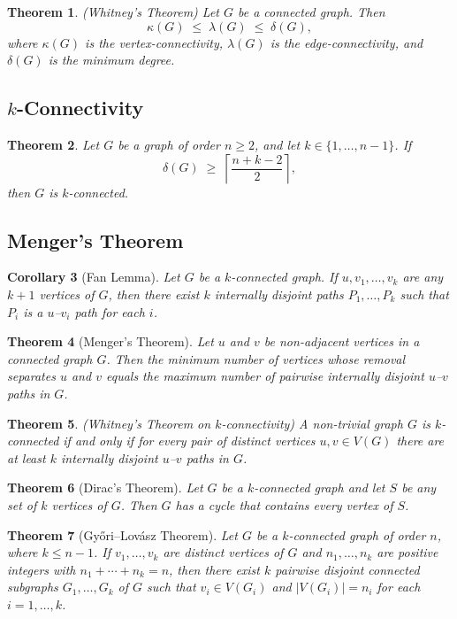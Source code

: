 \documentclass{article}
\newtheorem{theorem}{Theorem}[section]
\newtheorem{corollary}[theorem]{Corollary}
\begin{document}
\begin{theorem}
(Whitney's Theorem) Let $G$ be a connected graph. Then 
$$
\kappa(G)\;\le\;\lambda(G)\;\le\;\delta(G),
$$
where $\kappa(G)$ is the vertex-connectivity, $\lambda(G)$ is the edge-connectivity, and $\delta(G)$ is the minimum degree.
\end{theorem}

\subsection{$k$-Connectivity}
\begin{theorem}
Let $G$ be a graph of order $n\ge 2$, and let $k\in\{1,\dots,n-1\}$. If 
$$
\delta(G)\;\ge\;\left\lceil\frac{n+k-2}{2}\right\rceil,
$$
then $G$ is $k$-connected.
\end{theorem}

\subsection{Menger's Theorem}
\begin{corollary}[Fan Lemma]
Let $G$ be a $k$-connected graph. If $u,v_1,\dots,v_k$ are any $k+1$ vertices of $G$, then there exist $k$ internally disjoint paths $P_1,\dots,P_k$ such that $P_i$ is a $u$--$v_i$ path for each $i$.
\end{corollary}

\begin{theorem}[Menger's Theorem]
Let $u$ and $v$ be non-adjacent vertices in a connected graph $G$. Then the minimum number of vertices whose removal separates $u$ and $v$ equals the maximum number of pairwise internally disjoint $u$--$v$ paths in $G$.
\end{theorem}

\begin{theorem}
(Whitney's Theorem on $k$-connectivity) A non-trivial graph $G$ is $k$-connected if and only if for every pair of distinct vertices $u,v\in V(G)$ there are at least $k$ internally disjoint $u$--$v$ paths in $G$.
\end{theorem}

\begin{theorem}[Dirac's Theorem]
Let $G$ be a $k$-connected graph and let $S$ be any set of $k$ vertices of $G$. Then $G$ has a cycle that contains every vertex of $S$.
\end{theorem}

\begin{theorem}[Gy\H{o}ri--Lov\'asz Theorem]
Let $G$ be a $k$-connected graph of order $n$, where $k\le n-1$. If $v_1,\dots,v_k$ are distinct vertices of $G$ and $n_1,\dots,n_k$ are positive integers with $n_1+\cdots+n_k = n$, then there exist $k$ pairwise disjoint connected subgraphs $G_1,\dots,G_k$ of $G$ such that $v_i\in V(G_i)$ and $|V(G_i)|=n_i$ for each $i=1,\dots,k$.
\end{theorem}
\end{document}
